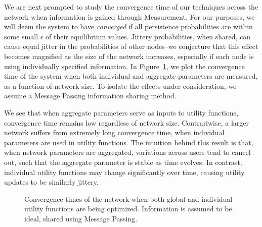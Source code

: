\documentclass[11pt]{IEEEtran}
\theoremstyle{definition}
\begin{document}
We are next prompted to study the convergence time of our techniques across the network when information is gained through Measurement. For our purposes, we will deem the system to have \emph{converged} if all persistence probabilities are within some small $\epsilon$ of their equilibrium values.  Jittery probabilities, when shared, can cause equal jitter in the probabilities of other nodes--we conjecture that this effect becomes magnified as the size of the network increases, especially if each node is using individually specified information.  In Figure~\ref{fig:IndAggconvergence}, we plot the convergence time of the system when both individual and aggregate parameters are measured, as a function of network size.  To isolate the effects under consideration, we assume a Message Passing information sharing method.

We see that when aggregate parameters serve as inputs to utility functions, convergence time remains low regardless of network size.  Contrariwise, a larger network suffers from extremely long convergence time, when individual parameters are used in utility functions.  The intuition behind this result is that, when network parameters are aggregated, variations across users tend to cancel out, such that the aggregate parameter is stable as time evolves.  In contrast, individual utility functions may change significantly over time, causing utility updates to be similarly jittery.

\begin{figure}[htp]
\begin{center}
  \caption{Convergence times of the network when both global and individual
  utility functions are being optimized.  Information is assumed to be ideal,
  shared using Message Passing.}
  \label{fig:IndAggconvergence}
\end{center}
\end{figure}
\end{document}
